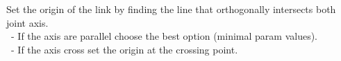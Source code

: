 \documentclass[preview]{standalone}
\begin{document}
\begin{center}
Set the origin of the link by finding the line that orthogonally intersects both joint axis.\\\
                 - If the axis are parallel choose the best option (minimal param values).\\\
                        - If the axis cross set the origin at the crossing point.
\end{center}
\end{document}
